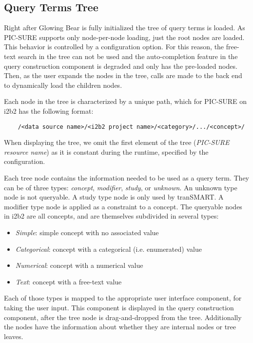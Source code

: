 
\subsection{Query Terms Tree}
\label{sec:design-tree}

Right after Glowing Bear is fully initialized the tree of query terms is loaded.
As PIC-SURE supports only node-per-node loading, just the root nodes are loaded. 
This behavior is controlled by a configuration option.
For this reason, the free-text search in the tree can not be used and the auto-completion feature in the query construction component is degraded and only has the pre-loaded nodes.
Then, as the user expands the nodes in the tree, calls are made to the back end to dynamically load the children nodes.

Each node in the tree is characterized by a unique path, which for PIC-SURE on i2b2 has the following format:
\begin{verbatim}
    /<data source name>/<i2b2 project name>/<category>/.../<concept>/
\end{verbatim}
When displaying the tree, we omit the first element of the tree (\emph{PIC-SURE resource name}) as it is constant during the runtime, specified by the configuration.

Each tree node contains the information needed to be used as a query term.
They can be of three types: \emph{concept}, \emph{modifier}, \emph{study}, or \emph{unknown}.
An unknown type node is not queryable. 
A study type node is only used by tranSMART.
A modifier type node is applied as a constraint to a concept.
The queryable nodes in i2b2 are all concepts, and are themselves subdivided in several types:
\begin{itemize}
    \setlength\itemsep{0em}
    \item \emph{Simple}: simple concept with no associated value
    \item \emph{Categorical}: concept with a categorical (i.e. enumerated) value
    \item \emph{Numerical}: concept with a numerical value
    \item \emph{Text}: concept with a free-text value
\end{itemize}
Each of those types is mapped to the appropriate user interface component, for taking the user input.
This component is displayed in the query construction component, after the tree node is drag-and-dropped from the tree.
Additionally the nodes have the information about whether they are internal nodes or tree leaves.


